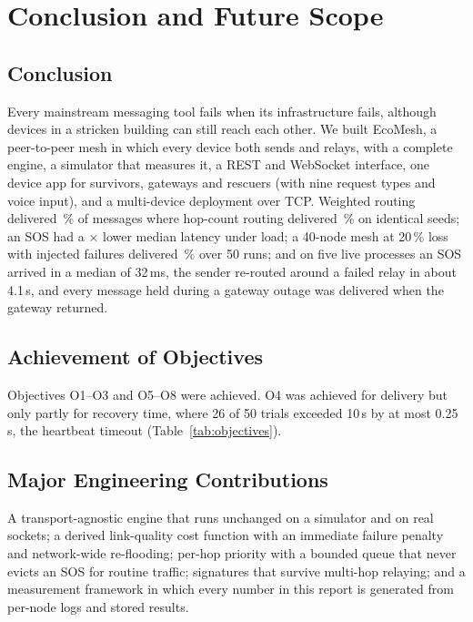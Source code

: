 \section{Conclusion and Future Scope}
\label{ch:concl}




\subsection{Conclusion}
Every mainstream messaging tool fails when its infrastructure fails, although devices in a stricken building can still reach each other. We built EcoMesh, a peer-to-peer mesh in which every device both sends and relays, with a complete engine, a simulator that measures it, a REST and WebSocket interface, one device app for survivors, gateways and rescuers (with nine request types and voice input), and a multi-device deployment over TCP. Weighted routing delivered \HopW\,\% of messages where hop-count routing delivered \HopH\,\% on identical seeds; an SOS had a \SosAdv$\times$ lower median latency under load; a 40-node mesh at 20\,\% loss with injected failures delivered \CollDel\,\% over 50 runs; and on five live processes an SOS arrived in a median of 32\,ms, the sender re-routed around a failed relay in about 4.1\,s, and every message held during a gateway outage was delivered when the gateway returned.

\subsection{Achievement of Objectives}
Objectives O1--O3 and O5--O8 were achieved. O4 was achieved for delivery but only partly for recovery time, where 26 of 50 trials exceeded 10\,s by at most 0.25\,s, the heartbeat timeout (Table~\ref{tab:objectives}).

\subsection{Major Engineering Contributions}
A transport-agnostic engine that runs unchanged on a simulator and on real sockets; a derived link-quality cost function with an immediate failure penalty and network-wide re-flooding; per-hop priority with a bounded queue that never evicts an SOS for routine traffic; signatures that survive multi-hop relaying; and a measurement framework in which every number in this report is generated from per-node logs and stored results.


